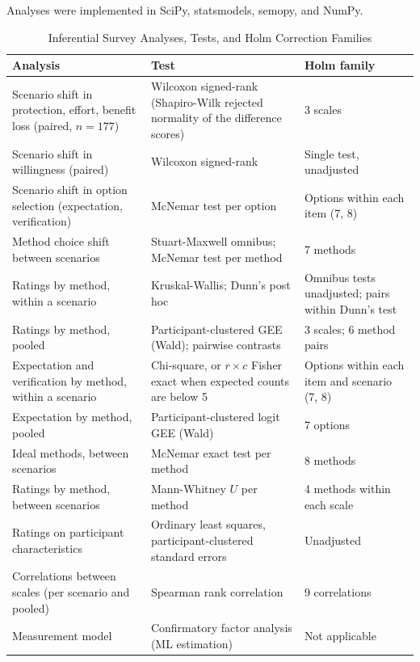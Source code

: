 \documentclass[conference,compsoc]{IEEEtran}
\begin{document}
Analyses were implemented in SciPy, statsmodels, semopy, and NumPy.

\begin{table}[t]
\centering
\caption{Inferential Survey Analyses, Tests, and Holm Correction Families}
\label{tab:analysis-families}
\small
\begin{tabular}{@{}p{}p{}p{}@{}}
\toprule
Analysis & Test & Holm family \\
\midrule
Scenario shift in protection, effort, benefit loss (paired, $n=177$)
  & Wilcoxon signed-rank (Shapiro-Wilk rejected normality of the difference scores)
  & 3 scales \\
Scenario shift in willingness (paired)
  & Wilcoxon signed-rank
  & Single test, unadjusted \\
Scenario shift in option selection (expectation, verification)
  & McNemar test per option
  & Options within each item (7, 8) \\
Method choice shift between scenarios
  & Stuart-Maxwell omnibus; McNemar test per method
  & 7 methods \\
Ratings by method, within a scenario
  & Kruskal-Wallis; Dunn's post hoc
  & Omnibus tests unadjusted; pairs within Dunn's test \\
Ratings by method, pooled
  & Participant-clustered GEE (Wald); pairwise contrasts
  & 3 scales; 6 method pairs \\
Expectation and verification by method, within a scenario
  & Chi-square, or $r\times c$ Fisher exact when expected counts are below 5
  & Options within each item and scenario (7, 8) \\
Expectation by method, pooled
  & Participant-clustered logit GEE (Wald)
  & 7 options \\
Ideal methods, between scenarios
  & McNemar exact test per method
  & 8 methods \\
Ratings by method, between scenarios
  & Mann-Whitney $U$ per method
  & 4 methods within each scale \\
Ratings on participant characteristics
  & Ordinary least squares, participant-clustered standard errors
  & Unadjusted \\
Correlations between scales (per scenario and pooled)
  & Spearman rank correlation
  & 9 correlations \\
Measurement model
  & Confirmatory factor analysis (ML estimation)
  & Not applicable \\
\bottomrule
\end{tabular}
\end{table}
\end{document}
